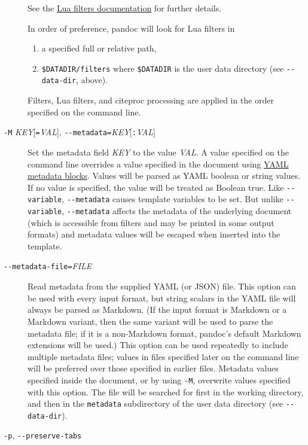 \documentclass[
]{article}
\begin{document}
\begin{description}
See the \href{https://pandoc.org/lua-filters.html}{Lua filters
documentation} for further details.

In order of preference, pandoc will look for Lua filters in

\begin{enumerate}
\def\labelenumi{\arabic{enumi}.}
\item
  a specified full or relative path,
\item
  \texttt{\$DATADIR/filters} where \texttt{\$DATADIR} is the user data
  directory (see \texttt{-\/-data-dir}, above).
\end{enumerate}

Filters, Lua filters, and citeproc processing are applied in the order
specified on the command line.
\item[\texttt{-M} \emph{KEY}{[}\texttt{=}\emph{VAL}{]},
\texttt{-\/-metadata=}\emph{KEY}{[}\texttt{:}\emph{VAL}{]}]
Set the metadata field \emph{KEY} to the value \emph{VAL}. A value
specified on the command line overrides a value specified in the
document using \hyperref[extension-yaml_metadata_block]{YAML metadata
blocks}. Values will be parsed as YAML boolean or string values. If no
value is specified, the value will be treated as Boolean true. Like
\texttt{-\/-variable}, \texttt{-\/-metadata} causes template variables
to be set. But unlike \texttt{-\/-variable}, \texttt{-\/-metadata}
affects the metadata of the underlying document (which is accessible
from filters and may be printed in some output formats) and metadata
values will be escaped when inserted into the template.
\item[\texttt{-\/-metadata-file=}\emph{FILE}]
Read metadata from the supplied YAML (or JSON) file. This option can be
used with every input format, but string scalars in the YAML file will
always be parsed as Markdown. (If the input format is Markdown or a
Markdown variant, then the same variant will be used to parse the
metadata file; if it is a non-Markdown format, pandoc's default Markdown
extensions will be used.) This option can be used repeatedly to include
multiple metadata files; values in files specified later on the command
line will be preferred over those specified in earlier files. Metadata
values specified inside the document, or by using \texttt{-M}, overwrite
values specified with this option. The file will be searched for first
in the working directory, and then in the \texttt{metadata} subdirectory
of the user data directory (see \texttt{-\/-data-dir}).
\item[\texttt{-p}, \texttt{-\/-preserve-tabs}]

\end{description}
\end{document}
